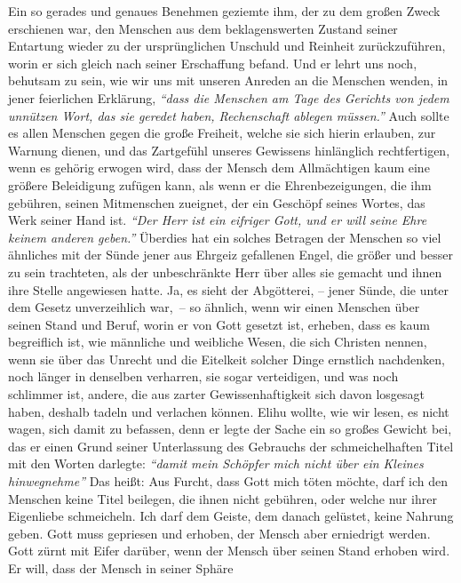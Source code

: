 Ein so gerades und genaues Benehmen geziemte ihm, der zu dem großen Zweck
erschienen war, den Menschen aus dem beklagenswerten Zustand seiner Entartung
wieder zu der ursprünglichen Unschuld und Reinheit zurückzuführen, worin er sich
gleich nach seiner Erschaffung befand. Und er lehrt uns noch, behutsam zu sein,
wie wir uns mit unseren Anreden an die Menschen wenden, in jener feierlichen
Erklärung,
\textit{"`dass die Menschen am Tage des Gerichts von jedem unnützen Wort, das
sie geredet haben, Rechenschaft ablegen
müssen."'}
Auch sollte es allen Menschen gegen die große Freiheit, welche sie sich hierin
erlauben, zur Warnung dienen, und das Zartgefühl unseres Gewissens hinlänglich
rechtfertigen, wenn es gehörig erwogen wird, dass der Mensch dem Allmächtigen
kaum eine größere Beleidigung zufügen kann, als wenn er die Ehrenbezeigungen,
die ihm gebühren, seinen Mitmenschen zueignet, der ein Geschöpf seines Wortes,
das Werk seiner Hand ist.
\textit{"`Der Herr ist ein eifriger Gott, und er will seine
Ehre keinem anderen geben."'} Überdies hat ein solches Betragen der Menschen so
viel ähnliches mit der Sünde jener aus Ehrgeiz gefallenen Engel, die größer und
besser zu sein trachteten, als der unbeschränkte Herr über alles sie gemacht und
ihnen ihre Stelle angewiesen hatte. Ja, es sieht der Abgötterei, -- jener
Sünde,
die unter dem Gesetz unverzeihlich war,~-- so ähnlich, wenn wir einen Menschen
über seinen Stand und Beruf, worin er von Gott gesetzt ist, erheben, dass es
kaum
begreiflich ist, wie männliche und weibliche Wesen, die sich Christen nennen,
wenn sie über das Unrecht und die Eitelkeit solcher Dinge ernstlich nachdenken,
noch länger in denselben verharren, sie sogar verteidigen, und was noch
schlimmer ist, andere, die aus zarter Gewissenhaftigkeit sich davon losgesagt
haben, deshalb tadeln und verlachen können. Elihu wollte, wie wir lesen, es
nicht wagen, sich damit zu befassen, denn er legte der Sache ein so großes
Gewicht bei, das er einen Grund seiner Unterlassung des Gebrauchs der
schmeichelhaften Titel mit den Worten darlegte:
\textit{"`damit mein Schöpfer mich nicht
über ein Kleines hinwegnehme"'} Das heißt: Aus Furcht, dass Gott mich töten
möchte,
darf ich den Menschen keine Titel beilegen, die ihnen nicht gebühren, oder
welche nur ihrer Eigenliebe schmeicheln. Ich darf dem Geiste, dem
danach gelüstet, keine Nahrung geben. Gott muss gepriesen und erhoben, der
Mensch aber erniedrigt werden. Gott zürnt mit Eifer darüber,
wenn der Mensch
über seinen Stand erhoben wird. Er will, dass der Mensch in seiner Sphäre
